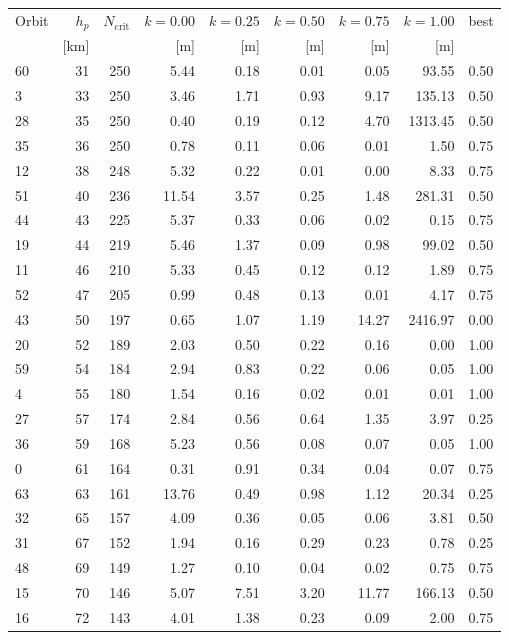 \begin{tabular}{@{}l r r r r r r r l@{}}
\toprule
Orbit & $h_p$ & $N_{\mathrm{crit}}$ & $k{=}0.00$ & $k{=}0.25$ & $k{=}0.50$ & $k{=}0.75$ & $k{=}1.00$ & best \\
 & [km] & & [m] & [m] & [m] & [m] & [m] & \\
\midrule
60 & 31 & 250 & 5.44 & 0.18 & 0.01 & 0.05 & 93.55 & 0.50 \\
3 & 33 & 250 & 3.46 & 1.71 & 0.93 & 9.17 & 135.13 & 0.50 \\
28 & 35 & 250 & 0.40 & 0.19 & 0.12 & 4.70 & 1313.45 & 0.50 \\
35 & 36 & 250 & 0.78 & 0.11 & 0.06 & 0.01 & 1.50 & 0.75 \\
12 & 38 & 248 & 5.32 & 0.22 & 0.01 & 0.00 & 8.33 & 0.75 \\
51 & 40 & 236 & 11.54 & 3.57 & 0.25 & 1.48 & 281.31 & 0.50 \\
44 & 43 & 225 & 5.37 & 0.33 & 0.06 & 0.02 & 0.15 & 0.75 \\
19 & 44 & 219 & 5.46 & 1.37 & 0.09 & 0.98 & 99.02 & 0.50 \\
11 & 46 & 210 & 5.33 & 0.45 & 0.12 & 0.12 & 1.89 & 0.75 \\
52 & 47 & 205 & 0.99 & 0.48 & 0.13 & 0.01 & 4.17 & 0.75 \\
43 & 50 & 197 & 0.65 & 1.07 & 1.19 & 14.27 & 2416.97 & 0.00 \\
20 & 52 & 189 & 2.03 & 0.50 & 0.22 & 0.16 & 0.00 & 1.00 \\
59 & 54 & 184 & 2.94 & 0.83 & 0.22 & 0.06 & 0.05 & 1.00 \\
4 & 55 & 180 & 1.54 & 0.16 & 0.02 & 0.01 & 0.01 & 1.00 \\
27 & 57 & 174 & 2.84 & 0.56 & 0.64 & 1.35 & 3.97 & 0.25 \\
36 & 59 & 168 & 5.23 & 0.56 & 0.08 & 0.07 & 0.05 & 1.00 \\
0 & 61 & 164 & 0.31 & 0.91 & 0.34 & 0.04 & 0.07 & 0.75 \\
63 & 63 & 161 & 13.76 & 0.49 & 0.98 & 1.12 & 20.34 & 0.25 \\
32 & 65 & 157 & 4.09 & 0.36 & 0.05 & 0.06 & 3.81 & 0.50 \\
31 & 67 & 152 & 1.94 & 0.16 & 0.29 & 0.23 & 0.78 & 0.25 \\
48 & 69 & 149 & 1.27 & 0.10 & 0.04 & 0.02 & 0.75 & 0.75 \\
15 & 70 & 146 & 5.07 & 7.51 & 3.20 & 11.77 & 166.13 & 0.50 \\
16 & 72 & 143 & 4.01 & 1.38 & 0.23 & 0.09 & 2.00 & 0.75 \\

\end{tabular}

